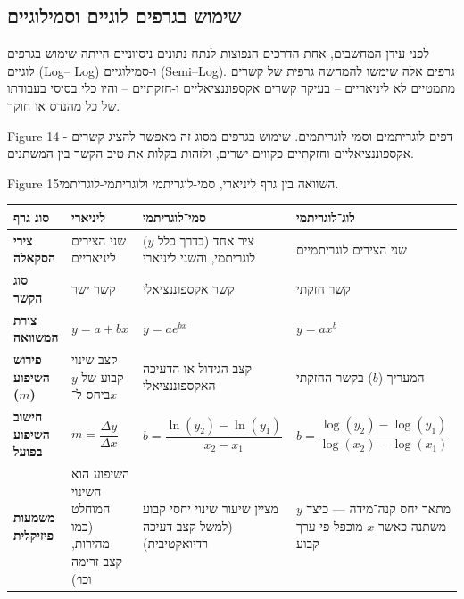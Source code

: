 \documentclass[
  hebrew,
  letterpaper,
  DIV=11,
  numbers=noendperiod]{scrreprt}
\begin{document}
\subsection{\texorpdfstring{{שימוש בגרפים לוגיים
וסמילוגיים}}{שימוש בגרפים לוגיים וסמילוגיים}}\label{ux5e9ux5d9ux5deux5d5ux5e9-ux5d1ux5d2ux5e8ux5e4ux5d9ux5dd-ux5dcux5d5ux5d2ux5d9ux5d9ux5dd-ux5d5ux5e1ux5deux5d9ux5dcux5d5ux5d2ux5d9ux5d9ux5dd}

{לפני עידן המחשבים, אחת הדרכים הנפוצות לנתח נתונים ניסיוניים הייתה שימוש
בגרפים לוגיים} (Log-- {}Log) {ו-סמילוגיים} (Semi--Log){. גרפים אלה שימשו
להמחשה גרפית של קשרים מתמטיים לא ליניאריים -- בעיקר קשרים אקספוננציאליים
ו-חזקתיים --} {והיו כלי בסיסי בעבודתו של כל מהנדס או חוקר}. {}

Figure {14} {- דפים לוגריתמים וסמי לוגריתמים. שימוש בגרפים מסוג זה מאפשר
להציג קשרים אקספוננציאליים וחזקתיים כקווים ישרים, ולזהות בקלות את טיב
הקשר בין המשתנים}.

Figure {15השוואה בין גרף ליניארי, סמי-לוגריתמי ולוגריתמי-לוגריתמי.}

\begin{longtable}[]{@{}
  >{\centering\arraybackslash}p{}
  >{\centering\arraybackslash}p{}
  >{\centering\arraybackslash}p{}
  >{\centering\arraybackslash}p{}@{}}
\toprule\noalign{}
\begin{minipage}[b]{\linewidth}\centering
\textbf{סוג גרף}
\end{minipage} & \begin{minipage}[b]{\linewidth}\centering
\textbf{ליניארי}
\end{minipage} & \begin{minipage}[b]{\linewidth}\centering
\textbf{סמי־לוגריתמי}
\end{minipage} & \begin{minipage}[b]{\linewidth}\centering
\textbf{לוג־לוגריתמי}
\end{minipage} \\
\midrule\noalign{}
\endhead
\bottomrule\noalign{}
\endlastfoot
\textbf{צירי הסקאלה} & שני הצירים ליניאריים & ציר אחד (בדרך כלל \(y\))
לוגריתמי, והשני ליניארי & שני הצירים לוגריתמיים \\
\textbf{סוג הקשר} & קשר ישר & קשר אקספוננציאלי & קשר חזקתי \\
\textbf{צורת המשוואה} & \(y = a + bx\) & \(y = a e^{bx}\) &
\(y = a x^{b}\) \\
\textbf{פירוש השיפוע (\(m\))} & קצב שינוי קבוע של \(y\) ביחס ל־\(x\) &
קצב הגידול או הדעיכה האקספוננציאלי & המעריך (\(b\)) בקשר החזקתי \\
\textbf{חישוב השיפוע בפועל} & \(m = \dfrac{\Delta y}{\Delta x}\) &
\(b = \dfrac{\ln(y_2) - \ln(y_1)}{x_2 - x_1}\) &
\(b = \dfrac{\log(y_2) - \log(y_1)}{\log(x_2) - \log(x_1)}\) \\
\textbf{משמעות פיזיקלית} & השיפוע הוא השינוי המוחלט (כמו מהירות, קצב
זרימה וכו׳) & מציין שיעור שינוי יחסי קבוע (למשל קצב דעיכה רדיואקטיבית) &
מתאר יחס קנה־מידה --- כיצד \(y\) משתנה כאשר \(x\) מוכפל פי ערך קבוע \\
\end{longtable}
\end{document}
